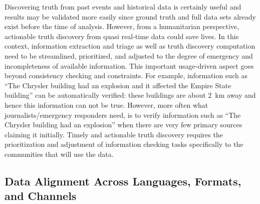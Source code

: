 \documentclass[prodmode,acmtecs]{acmsmall} %
\begin{document}
Discovering truth from past events and historical data is certainly useful and results may be validated more easily since ground truth and full data sets already exist before the time of analysis. However, from a humanitarian perspective, actionable truth discovery from quasi real-time data could save lives. %
In this context, information extraction and triage as well as truth discovery computation need to be streamlined, prioritized,  and adjusted to the degree of emergency and incompleteness of available information. This important usage-driven aspect goes beyond consistency checking and constraints. For example, information such as ``The Chrysler building had an explosion and it affected the Empire State building'' can be automatically verified: these buildings are about 2~km away and hence this information can not be true. However, more often what journalists/emergency responders need, is to verify information such as ``The Chrysler building had an explosion'' when there are very few primary sources claiming it initially. Timely and actionable truth discovery requires the prioritization and adjustment of information checking tasks specifically to the communities that will use the data.
%

\subsection{Data Alignment Across Languages, Formats, and Channels} 
\end{document}
